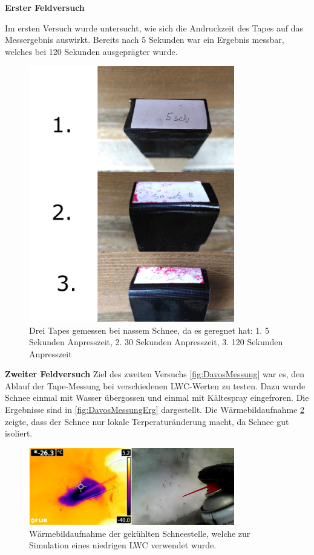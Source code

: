 


\textbf{Erster Feldversuch}
\label{ersterFeldVer}

Im ersten Versuch wurde untersucht, wie sich die Andruckzeit des Tapes auf das Messergebnis auswirkt. Bereits nach 5 Sekunden war ein Ergebnis messbar, welches bei 120 Sekunden ausgeprägter wurde.

\begin{figure}[H]
    \centering
    \includegraphics[width=0.8\textwidth]{Bilder/ZeitAbha.png}
    \caption{Drei Tapes gemessen bei nassem Schnee, da es geregnet hat: 1. 5 Sekunden Anpresszeit, 2. 30 Sekunden Anpresszeit, 3. 120 Sekunden Anpresszeit} 
    \label{fig:ZeitDruck}
\end{figure}

\newpage
\textbf{Zweiter Feldversuch}
\label{zweitFeldVer}
Ziel des zweiten Versuchs \ref{fig:DavosMessung} war es, den Ablauf der Tape-Messung bei verschiedenen LWC-Werten zu testen. Dazu wurde Schnee einmal mit Wasser übergossen und einmal mit Kältespray eingefroren. Die Ergebnisse sind in \ref{fig:DavosMessungErg} dargestellt. Die Wärmebildaufnahme \ref{fig:KaltSchnee} zeigte, dass der Schnee nur lokale Terperaturänderung macht, da Schnee gut isoliert. 

\begin{figure}[H]
    \centering
    \includegraphics[width=0.8\textwidth]{Bilder/KalterSchnee.png}
    \caption{Wärmebildaufnahme der gekühlten Schneestelle, welche zur Simulation eines niedrigen LWC verwendet wurde.} 
    \label{fig:KaltSchnee}
\end{figure}



